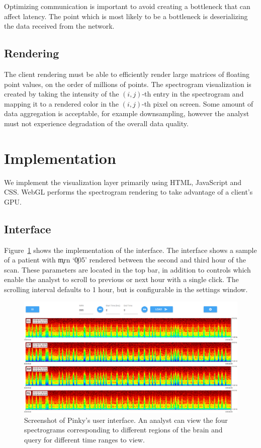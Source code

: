 Optimizing communication is important to avoid creating a bottleneck that can
affect latency. The point which is most likely to be a bottleneck is
deserializing the data received from the network.

\subsection{Rendering}

The client rendering must be able to efficiently render large matrices of
floating point values, on the order of millions of points. The spectrogram
visualization is created by taking the intensity of the $(i, j)$-th entry in
the spectrogram and mapping it to a rendered color in the $(i, j)$-th pixel on
screen. Some amount of data aggregation is acceptable, for example
downsampling, however the analyst must not experience degradation of the
overall data quality. \\

\section{Implementation}

We implement the visualization layer primarily using HTML, JavaScript and CSS.
WebGL performs the spectrogram rendering to take advantage of a client's GPU.

\subsection{Interface}

Figure~\ref{fig:whole-interface} shows the implementation of the interface. The
interface shows a sample of a patient with \c{mrn} `\c{005}' rendered between
the second and third hour of the scan. These parameters are located in the top
bar, in addition to controls which enable the analyst to scroll to previous or
next hour with a single click. The scrolling interval defaults to 1 hour, but
is configurable in the settings window. \\

\begin{figure}[h]
\begin{center}
\includegraphics[scale=0.35]{./img/whole-interface.png}
\caption{Screenshot of Pinky's user interface. An analyst can view the four
  spectrograms corresponding to different regions of the brain and query for
  different time ranges to view.}
\label{fig:whole-interface}
\end{center}
\end{figure}

